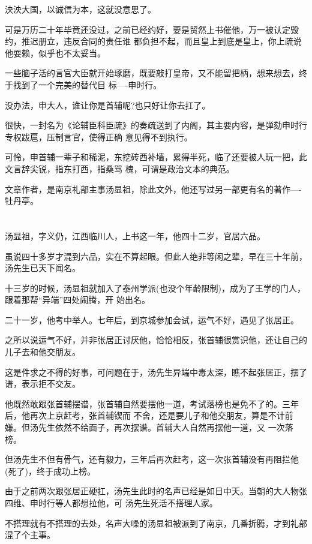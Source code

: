 \documentclass[11pt,a4paper,onecolumn]{article}
\begin{document}
泱泱大国，以诚信为本，这就没意思了。

可是万历二十年毕竟还没过，之前已经约好，要是贸然上书催他，万一被认定毁约，推迟册立，违反合同的责任谁
都负担不起，而且皇上到底是皇上，你上疏说他耍赖，似乎也不太妥当。

一些脑子活的言官大臣就开始琢磨，既要敲打皇帝，又不能留把柄，想来想去，终于找到了一个完美的替代目
标----申时行。

没办法，申大人，谁让你是首辅呢?也只好让你去扛了。

很快，一封名为《论辅臣科臣疏》的奏疏送到了内阁，其主要内容，是弹劾申时行专权跋扈，压制言官，使得正确
意见得不到执行。

可怜，申首辅一辈子和稀泥，东挖砖西补墙，累得半死，临了还要被人玩一把，此文言辞尖锐，指东打西，指桑骂
槐，可谓是政治文本的典范。

文章作者，是南京礼部主事汤显祖，除此文外，他还写过另一部更有名的著作----牡丹亭。

\section[\thesection]{}

汤显祖，字义仍，江西临川人，上书这一年，他四十二岁，官居六品。

虽说四十多岁才混到六品，实在不算起眼。但此人绝非等闲之辈，早在三十年前，汤先生已天下闻名。

十三岁的时候，汤显祖就加入了泰州学派(也没个年龄限制)，成为了王学的门人，跟着那帮``异端''四处闹腾，开
始出名。

二十一岁，他考中举人。七年后，到京城参加会试，运气不好，遇见了张居正。

之所以说运气不好，并非张居正讨厌他，恰恰相反，张首辅很赏识他，还让自己的儿子去和他交朋友。

这是件求之不得的好事，可问题在于，汤先生异端中毒太深，瞧不起张居正，摆了谱，表示拒不交友。

他既然敢跟张首辅摆谱，张首辅自然要摆他一道，考试落榜也是免不了的。三年后，他再次上京赶考，张首辅锲而
不舍，还是要儿子和他交朋友，算是不计前嫌。但汤先生依然不给面子，再次摆谱。首辅大人自然再摆他一道，又
一次落榜。

但汤先生不但有骨气，还有毅力，三年后再次赶考，这一次张首辅没有再阻拦他(死了)，终于成功上榜。

由于之前两次跟张居正硬扛，汤先生此时的名声已经是如日中天。当朝的大人物张四维、申时行等人都想拉他，可
汤先生死活不搭理人家。

不搭理就有不搭理的去处，名声大噪的汤显祖被派到了南京，几番折腾，才到礼部混了个主事。
\end{document}
